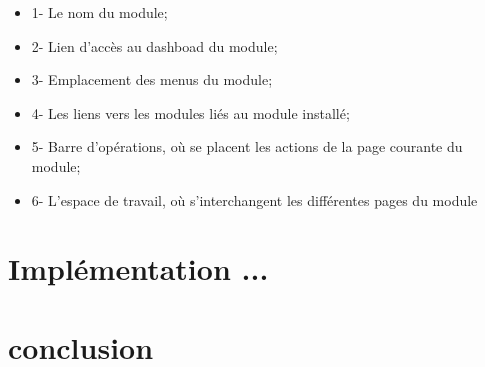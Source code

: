 \documentclass[a4paper,12pt]{article}
\begin{document}
\begin{itemize}
\item 1- Le nom du module;
\item 2- Lien d'accès au dashboad du module;
\item 3- Emplacement des menus du module;
\item 4- Les liens vers les modules liés au module installé;
\item 5- Barre d'opérations, où se placent les actions de la page
  courante du module;
\item 6- L'espace de travail, où s'interchangent les différentes pages
  du module
\end{itemize}

\section{Implémentation ...}
\section{conclusion}
\end{document}
